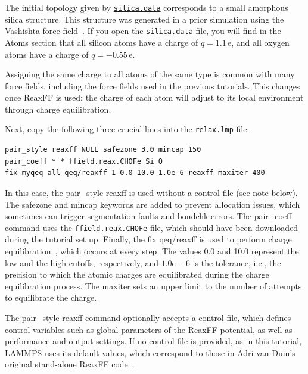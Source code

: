 \documentclass[9pt,tutorial]{livecoms}
\newcommand{\lmpcmd}[1]{\colorbox{listing}{\textcolor{command}{\small{#1}}}} %
\newcommand{\flecmd}[1]{\textcolor{command}{\texttt{#1}}} %
\newcommand{\dwlcmd}[1]{\textcolor{download}{\texttt{#1}}} %
\newcommand{\filepath}{https://raw.githubusercontent.com/lammpstutorials/lammpstutorials-article/main/files/}
\begin{document}
The initial topology given by \href{\filepath tutorial5/silica.data}{\dwlcmd{silica.data}}
{\color{blue} corresponds to} a small amorphous silica structure.  
{\color{blue}This structure was generated in a prior
simulation using the Vashishta force field~\cite{vashishta1990interaction}.}
If you open the \flecmd{silica.data} file, you will find in the \lmpcmd{Atoms}
section that all silicon atoms have a charge of $q = 1.1\,\text{e}$, and all oxygen
atoms have a charge of $q = -0.55\,\text{e}$.

\begin{note}
Assigning the same charge to all atoms of the same type is common with many
force fields, including the force fields used in the previous tutorials.  This
changes once ReaxFF is used: the charge of each atom will adjust to its local
environment {\color{blue}through charge equilibration}.
\end{note}

Next, copy the following three crucial lines into the \flecmd{relax.lmp} file:
\begin{lstlisting}
pair_style reaxff NULL safezone 3.0 mincap 150
pair_coeff * * ffield.reax.CHOFe Si O
fix myqeq all qeq/reaxff 1 0.0 10.0 1.0e-6 reaxff maxiter 400
\end{lstlisting}
In this case, the \lmpcmd{pair\_style reaxff} is used without a control file 
{\color{blue}(see note below)}.  The
\lmpcmd{safezone} and \lmpcmd{mincap} keywords are added to prevent
allocation issues, which sometimes can trigger segmentation faults and
\lmpcmd{bondchk} errors.  The \lmpcmd{pair\_coeff} command uses the
\href{\filepath tutorial5/ffield.reax.CHOFe}{\dwlcmd{ffield.reax.CHOFe}}
file, which should have been downloaded during the tutorial set up.  Finally, the
\lmpcmd{fix qeq/reaxff} is used to perform charge equilibration~\cite{rappe1991charge},
which occurs at every step.  The values 0.0 and 10.0 represent the
low and the high cutoffs, respectively, and $1.0 \text{e} -6$ is the
{\color{blue}tolerance, i.e., the precision to which the atomic charges are
equilibrated during the charge equilibration process.}
The \lmpcmd{maxiter} sets an upper limit to the number of attempts to
equilibrate the charge.

\begin{note}
{\color{blue}
The \lmpcmd{pair\_style reaxff} command optionally accepts a control file,
which defines control variables such as
global parameters of the ReaxFF potential, as well as performance and output settings.
If no control file is provided, as in this tutorial, LAMMPS uses its default values,
which correspond to those in Adri van Duin's original stand-alone ReaxFF code~\cite{van2001reaxff}.}
\end{note}
\end{document}
